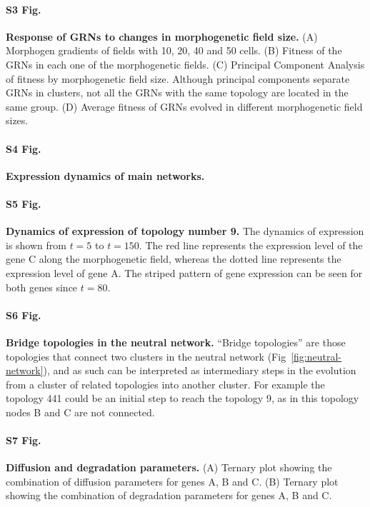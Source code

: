\documentclass[10pt,letterpaper]{article}
\begin{document}
\paragraph*{S3 Fig.}
\label{S3_Fig}
{\bf Response of GRNs to changes in morphogenetic field size.}
(A) Morphogen gradients of fields with 10, 20, 40 and 50 cells. (B) Fitness of the
GRNs in each one of the morphogenetic fields. (C) Principal Component Analysis
of fitness by morphogenetic field size. Although principal components separate
GRNs in clusters, not all the GRNs with the same topology are located in the
same group. (D) Average fitness of GRNs evolved in different morphogenetic
field sizes.

\paragraph*{S4 Fig.}
\label{S4_Fig}
{\bf Expression dynamics of main networks.}

\paragraph*{S5 Fig.}
\label{S5_Fig}
{\bf Dynamics of expression of topology number 9.}
The dynamics of expression is shown from $t = 5$ to $t = 150$. The red line
represents the expression level of the gene C along the morphogenetic field,
whereas the dotted line represents the expression level of gene A. The
striped pattern of gene expression can be seen for both genes since $t = 80$.

\paragraph*{S6 Fig.}
\label{S6_Fig}
{\bf Bridge topologies in the neutral network.}
``Bridge topologies'' are those topologies that connect two clusters in the neutral
network (Fig~\ref{fig:neutral-network}), and as such can be interpreted as
intermediary steps in the evolution from a cluster of related topologies into
another cluster. For example the topology 441 could be an initial step to reach the
topology 9, as in this topology nodes B and C are not connected.

\paragraph*{S7 Fig.}
\label{S7_Fig}
{\bf Diffusion and degradation parameters.}
(A) Ternary plot showing the combination of diffusion parameters for genes A,
B and C. (B) Ternary plot showing the combination of degradation parameters
for genes A, B and C.
\end{document}
